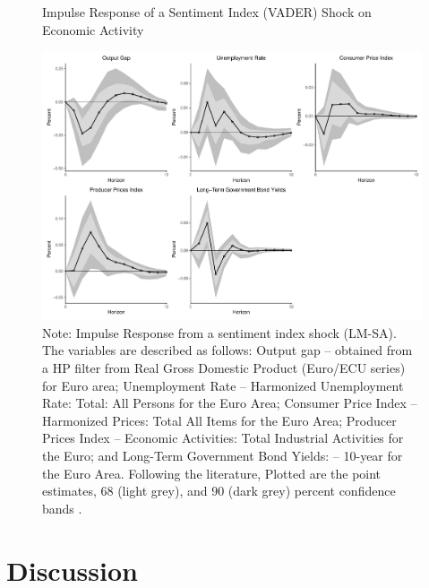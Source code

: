 \begin{figure}
    \centering
    \caption{Impulse Response of a Sentiment Index (VADER) Shock on Economic Activity}
    \includegraphics[width=\textwidth]{images/irf_vader.pdf}
    \caption*{Note: Impulse Response from a sentiment index shock (LM-SA). The variables are described as follows: Output gap -- obtained from a HP filter from Real Gross Domestic Product (Euro/ECU series) for Euro area; Unemployment Rate -- Harmonized Unemployment Rate: Total: All Persons for the Euro Area; Consumer Price Index -- Harmonized Prices: Total All Items for the Euro Area; Producer Prices Index -- Economic Activities: Total Industrial Activities for the Euro; and Long-Term Government Bond Yields: -- 10-year for the Euro Area. Following the literature, Plotted are the point estimates, 68 (light grey), and 90 (dark grey) percent confidence bands \cite[p. 40]{shapiro2020measuring}.}
    \label{fig:my_label}
\end{figure}

\section{Discussion}



